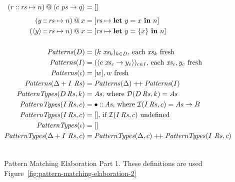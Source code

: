 \documentclass[11pt]{article}
\newcommand{\key}[1]{\textbf{#1}} %
\newcommand{\handleSymbol}{\rightarrow}
\newcommand{\handle}[2]{{#1} \handleSymbol {#2}}
\newcommand{\thunk}[1]{\{{#1}\}}
\newcommand{\effin}[1]{\langle {#1} \rangle}
\newcommand{\id}{\iota}
\begin{document}
\begin{figure*}
\begin{align*}
(r \cons \rs \mapsto n) \proj \effin{\handle{c~\ps}{q}} &= \emptylist \\[1ex]
(y \cons \rs \mapsto n) \proj x &= [\rs \mapsto \key{let}~y = x~\key{in}~n] \\
(\effin{y} \cons \rs \mapsto n) \proj x &=
  [\rs \mapsto \key{let}~y = \thunk{x}~\key{in}~n] \\
\\
\Patterns(D) &= (k~\xs_k)_{k \in D}, \, \text{each }\xs_k \text{ fresh} \\
\Patterns(I) &= (\effin{\handle{c~\xs_c}{y_c}})_{c \in I}, \, \text{each }\xs_c, y_c \text{ fresh} \\
\Patterns(\id) &= [w],  w \text{ fresh} \\
\Patterns(\Delta + I~\Rs) &= \Patterns(\Delta) \concat \Patterns(I) \\
\PatternTypes(D\,\Rs, k) &= \As, \, \text{where }\dcon(D\,\Rs, k) = \As \\
\PatternTypes(I\,\Rs, c) &= \bullet \cons \As, \,   \text{where }\icom(I\,\Rs, c) = \As \to B \\
\PatternTypes(I\,\Rs, c) &= [], \, \text{if }\icom(I\,\Rs, c)\text{ undefined} \\
\PatternTypes(\id) &= \emptylist \\
\PatternTypes(\Delta + I~\Rs, c) &= 
\PatternTypes(\Delta, c) \concat \PatternTypes(I~\Rs, c) \\
\\
\end{align*}
\caption{Pattern Matching Elaboration Part 1. These definitions are used Figure~\ref{fig:pattern-matching-elaboration-2}}
\label{fig:pattern-matching-elaboration}
\end{figure*}
\end{document}
